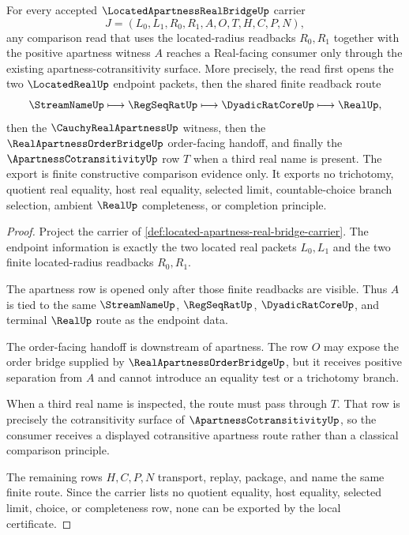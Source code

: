 \begin{theorem}
\label{thm:located-real-apartness-cotransitive-bridge}
For every accepted $\LocatedApartnessRealBridgeUp$ carrier
$$
J=(L_0,L_1,R_0,R_1,A,O,T,H,C,P,N),
$$
any comparison read that uses the located-radius readbacks $R_0,R_1$ together with the positive apartness witness $A$ reaches a Real-facing consumer only through the existing apartness-cotransitivity surface. More precisely, the read first opens the two $\LocatedRealUp$ endpoint packets, then the shared finite readback route
$$
\StreamNameUp \longmapsto \RegSeqRatUp \longmapsto \DyadicRatCoreUp \longmapsto \RealUp,
$$
then the $\CauchyRealApartnessUp$ witness, then the $\RealApartnessOrderBridgeUp$ order-facing handoff, and finally the $\ApartnessCotransitivityUp$ row $T$ when a third real name is present. The export is finite constructive comparison evidence only. It exports no trichotomy, quotient real equality, host real equality, selected limit, countable-choice branch selection, ambient $\RealUp$ completeness, or completion principle.
\end{theorem}
\begin{proof}
Project the carrier of \autoref{def:located-apartness-real-bridge-carrier}. The endpoint information is exactly the two located real packets $L_0,L_1$ and the two finite located-radius readbacks $R_0,R_1$.

The apartness row is opened only after those finite readbacks are visible. Thus $A$ is tied to the same $\StreamNameUp$, $\RegSeqRatUp$, $\DyadicRatCoreUp$, and terminal $\RealUp$ route as the endpoint data.

The order-facing handoff is downstream of apartness. The row $O$ may expose the order bridge supplied by $\RealApartnessOrderBridgeUp$, but it receives positive separation from $A$ and cannot introduce an equality test or a trichotomy branch.

When a third real name is inspected, the route must pass through $T$. That row is precisely the cotransitivity surface of $\ApartnessCotransitivityUp$, so the consumer receives a displayed cotransitive apartness route rather than a classical comparison principle.

The remaining rows $H,C,P,N$ transport, replay, package, and name the same finite route. Since the carrier lists no quotient equality, host equality, selected limit, choice, or completeness row, none can be exported by the local certificate.
\end{proof}

